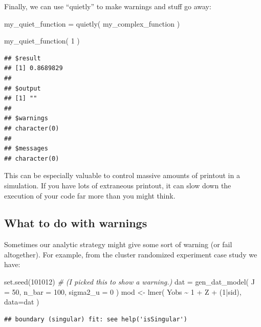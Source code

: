 \documentclass[
]{book}
\newenvironment{Shaded}{\begin{snugshade}}{\end{snugshade}}
\newcommand{\AttributeTok}[1]{\textcolor[rgb]{0.77,0.63,0.00}{#1}}
\newcommand{\CommentTok}[1]{\textcolor[rgb]{0.56,0.35,0.01}{\textit{#1}}}
\newcommand{\DecValTok}[1]{\textcolor[rgb]{0.00,0.00,0.81}{#1}}
\newcommand{\FunctionTok}[1]{\textcolor[rgb]{0.00,0.00,0.00}{#1}}
\newcommand{\NormalTok}[1]{#1}
\newcommand{\OtherTok}[1]{\textcolor[rgb]{0.56,0.35,0.01}{#1}}
\newcommand{\SpecialCharTok}[1]{\textcolor[rgb]{0.00,0.00,0.00}{#1}}
\begin{document}
Finally, we can use ``quietly'' to make warnings and stuff go away:

\begin{Shaded}
\begin{Highlighting}[]
\NormalTok{my\_quiet\_function }\OtherTok{=} \FunctionTok{quietly}\NormalTok{( my\_complex\_function )}

\FunctionTok{my\_quiet\_function}\NormalTok{( }\DecValTok{1}\NormalTok{ )}
\end{Highlighting}
\end{Shaded}

\begin{verbatim}
## $result
## [1] 0.8689829
## 
## $output
## [1] ""
## 
## $warnings
## character(0)
## 
## $messages
## character(0)
\end{verbatim}

This can be especially valuable to control massive amounts of printout in a simulation. If you have lots of extraneous printout, it can slow down the execution of your code far more than you might think.

\hypertarget{what-to-do-with-warnings}{%
\subsection{What to do with warnings}\label{what-to-do-with-warnings}}

Sometimes our analytic strategy might give some sort of warning (or fail altogether).
For example, from the cluster randomized experiment case study we have:

\begin{Shaded}
\begin{Highlighting}[]
\FunctionTok{set.seed}\NormalTok{(}\DecValTok{101012}\NormalTok{)  }\CommentTok{\# (I picked this to show a warning.)}
\NormalTok{dat }\OtherTok{=} \FunctionTok{gen\_dat\_model}\NormalTok{( }\AttributeTok{J =} \DecValTok{50}\NormalTok{, }\AttributeTok{n\_bar =} \DecValTok{100}\NormalTok{, }\AttributeTok{sigma2\_u =} \DecValTok{0}\NormalTok{ )}
\NormalTok{mod }\OtherTok{\textless{}{-}} \FunctionTok{lmer}\NormalTok{( Yobs }\SpecialCharTok{\textasciitilde{}} \DecValTok{1} \SpecialCharTok{+}\NormalTok{ Z }\SpecialCharTok{+}\NormalTok{ (}\DecValTok{1}\SpecialCharTok{|}\NormalTok{sid), }\AttributeTok{data=}\NormalTok{dat )}
\end{Highlighting}
\end{Shaded}

\begin{verbatim}
## boundary (singular) fit: see help('isSingular')
\end{verbatim}
\end{document}
